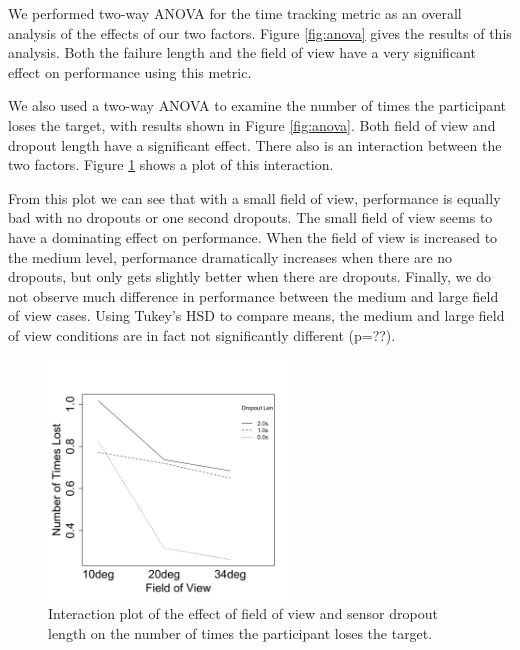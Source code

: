\documentclass{acmsiggraph}                     %
\begin{document}


We performed two-way {ANOVA} for the time tracking metric as an overall analysis of the effects of our two factors.  Figure \ref{fig:anova} gives the results of this analysis.  Both the failure length and the field of view have a very significant effect on performance using this metric.  

We also used a two-way {ANOVA} to examine the number of times the participant loses the target, with results shown in Figure \ref{fig:anova}.  Both field of view and dropout length have a significant effect.  There also is an interaction between the two factors.  Figure \ref{fig:interaction} shows a plot of this interaction.  

From this plot we can see that with a small field of view, performance is equally bad with no dropouts or one second dropouts.  The small field of view seems to have a dominating effect on performance.  When the field of view is increased to the medium level, performance dramatically increases when there are no dropouts, but only gets slightly better when there are dropouts.  Finally, we do not observe much difference in performance between the medium and large field of view cases.  Using Tukey's HSD to compare means, the medium and large field of view conditions are in fact not significantly different (p=??).

\begin{figure}[t]
	\centering
	\includegraphics[width=2.5in]{figures/numtimes_interaction.pdf}
	\caption{\label{fig:interaction}Interaction plot of the effect of field of view and sensor dropout length on the number of times the participant loses the target.}
\end{figure}
\end{document}
